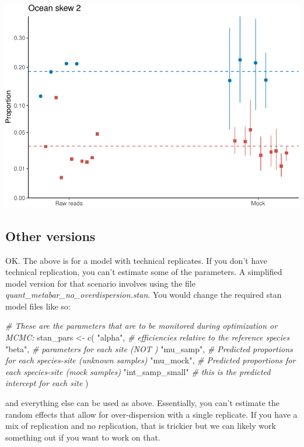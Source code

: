\documentclass[
]{article}
\newenvironment{Shaded}{\begin{snugshade}}{\end{snugshade}}
\newcommand{\CommentTok}[1]{\textcolor[rgb]{0.56,0.35,0.01}{\textit{#1}}}
\newcommand{\FunctionTok}[1]{\textcolor[rgb]{0.00,0.00,0.00}{#1}}
\newcommand{\NormalTok}[1]{#1}
\newcommand{\OtherTok}[1]{\textcolor[rgb]{0.56,0.35,0.01}{#1}}
\newcommand{\StringTok}[1]{\textcolor[rgb]{0.31,0.60,0.02}{#1}}
\begin{document}
\includegraphics{Appendix-S4_files/figure-latex/stan_plotting_bayes-2.pdf}

\hypertarget{other-versions}{%
\subsection{Other versions}\label{other-versions}}

OK. The above is for a model with technical replicates. If you don't
have technical replication, you can't estimate some of the parameters. A
simplified model version for that scenario involves using the file
\emph{quant\_metabar\_no\_overdispersion.stan}. You would change the
required stan model files like so:

\begin{Shaded}
\begin{Highlighting}[]
\CommentTok{\# These are the parameters that are to be monitored during optimization or MCMC:}
\NormalTok{stan\_pars }\OtherTok{\textless{}{-}} \FunctionTok{c}\NormalTok{(}
  \StringTok{"alpha"}\NormalTok{, }\CommentTok{\# efficiencies relative to the reference species}
  \StringTok{"beta"}\NormalTok{,  }\CommentTok{\# parameters for each site (NOT )}
  \StringTok{"mu\_samp"}\NormalTok{, }\CommentTok{\# Predicted proportions for each species{-}site (unknown samples)}
  \StringTok{"mu\_mock"}\NormalTok{, }\CommentTok{\# Predicted proportions for each species{-}site (mock samples)}
  \StringTok{"int\_samp\_small"} \CommentTok{\# this is the predicted intercept for each site }
\NormalTok{)}
\end{Highlighting}
\end{Shaded}

and everything else can be used as above. Essentially, you can't
estimate the random effects that allow for over-dispersion with a single
replicate. If you have a mix of replication and no replication, that is
trickier but we can likely work something out if you want to work on
that.
\end{document}
